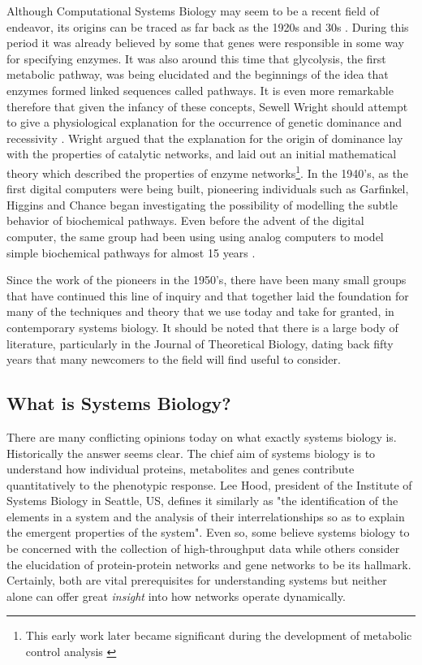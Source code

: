 \documentclass[12pt]{article}
\begin{document}
Although Computational Systems Biology may seem to be a recent
field of endeavor, its origins can be traced as far back as the
1920s and 30s \cite{Wright1929}. During this period it was already
believed by some that genes were responsible in some way for
specifying enzymes. It was also around this time that glycolysis,
the first metabolic pathway, was being elucidated and the
beginnings of the idea that enzymes formed linked sequences called
pathways. It is even more remarkable therefore that given the
infancy of these concepts, Sewell Wright should attempt to give a
physiological explanation for the occurrence of genetic dominance
and recessivity \cite{Wright1934}. Wright argued that the
explanation for the origin of dominance lay with the properties of
catalytic networks, and laid out an initial mathematical theory
which described the properties of enzyme networks\footnote{This
early work later became significant during the development of
metabolic control analysis \cite{KB81}}. In the 1940's, as the
first digital computers were being built, pioneering individuals such as 
Garfinkel, Higgins and Chance began investigating the possibility of 
modelling the subtle behavior of biochemical pathways. Even before the
advent of the digital computer, the same group had been using using 
analog computers to model simple biochemical pathways for almost 15 years \cite{Ga61,Hi59,Chance1943}.

Since the work of the pioneers in the 1950's, there have been many
small groups that have continued this line of inquiry and that
together laid the foundation for many of the techniques and
theory that we use today and take for granted, in contemporary
systems biology. It should be noted that there is a large body of
literature, particularly in the Journal of Theoretical Biology,
dating back fifty years that many newcomers to the field will find
useful to consider.

\subsection{What is Systems Biology?}

There are many conflicting opinions today on what exactly systems
biology is. Historically the answer seems clear. The chief aim of
systems biology is to understand how individual proteins,
metabolites and genes contribute quantitatively to the phenotypic
response. Lee Hood, president of the Institute of Systems Biology
in Seattle, US, defines it similarly as "the identification of the
elements in a system and the analysis of their interrelationships
so as to explain the emergent properties of the system". Even so,
some believe systems biology to be concerned with the collection
of high-throughput data while others consider the elucidation of
protein-protein networks and gene networks to be its hallmark.
Certainly, both are vital prerequisites for understanding systems
but neither alone can offer great {\em insight} into how networks
operate dynamically.
\end{document}
